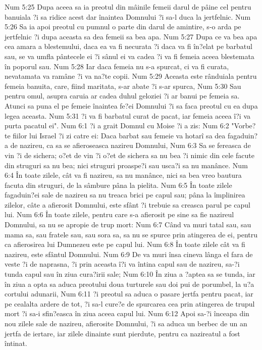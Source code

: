 Num 5:25  Dupa aceea sa ia preotul din mâinile femeii darul de pâine cel pentru banuiala ?i sa ridice acest dar înaintea Domnului ?i sa-l duca la jertfelnic.
Num 5:26  Sa ia apoi preotul cu pumnul o parte din darul de amintire, s-o arda pe jertfelnic ?i dupa aceasta sa dea femeii sa bea apa.
Num 5:27  Dupa ce va bea apa cea amara a blestemului, daca ea va fi necurata ?i daca va fi în?elat pe barbatul sau, se va umfla pântecele ei ?i sânul ei va cadea ?i va fi femeia aceea blestemata în poporul sau.
Num 5:28  Iar daca femeia nu s-a spurcat, ci va fi curata, nevatamata va ramâne ?i va na?te copii.
Num 5:29  Aceasta este rânduiala pentru femeia banuita, care, fiind maritata, s-ar abate ?i s-ar spurca,
Num 5:30  Sau pentru omul, asupra caruia ar cadea duhul geloziei ?i ar banui pe femeia sa. Atunci sa puna el pe femeie înaintea fe?ei Domnului ?i sa faca preotul cu ea dupa legea aceasta.
Num 5:31  ?i va fi barbatul curat de pacat, iar femeia aceea î?i va purta pacatul ei".
Num 6:1  ?i a grait Domnul cu Moise ?i a zis:
Num 6:2  "Vorbe?te fiilor lui Israel ?i zi catre ei: Daca barbat sau femeie va hotarî sa dea fagaduin?a de nazireu, ca sa se afieroseasca nazireu Domnului,
Num 6:3  Sa se fereasca de vin ?i de sichera; o?et de vin ?i o?et de sichera sa nu bea ?i nimic din cele facute din struguri sa nu bea; nici struguri proaspe?i sau usca?i sa nu manânce.
Num 6:4  În toate zilele, cât va fi nazireu, sa nu manânce, nici sa bea vreo bautura facuta din struguri, de la sâmbure pâna la pielita.
Num 6:5  În toate zilele fagaduin?ei sale de nazireu sa nu treaca brici pe capul sau; pâna la împlinirea zilelor, câte a afierosit Domnului, este sfânt ?i trebuie sa creasca parul pe capul lui.
Num 6:6  În toate zilele, pentru care s-a afierosit pe sine sa fie nazireul Domnului, sa nu se apropie de trup mort:
Num 6:7  Când va muri tatal sau, sau mama sa, sau fratele sau, sau sora sa, sa nu se spurce prin atingerea de ei, pentru ca afierosirea lui Dumnezeu este pe capul lui.
Num 6:8  În toate zilele cât va fi nazireu, este sfântul Domnului.
Num 6:9  De va muri însa cineva lânga el fara de veste ?i de naprasna, ?i prin aceasta î?i va întina capul sau de nazireu, sa-?i tunda capul sau în ziua cura?irii sale;
Num 6:10  În ziua a ?aptea sa se tunda, iar în ziua a opta sa aduca preotului doua turturele sau doi pui de porumbel, la u?a cortului adunarii,
Num 6:11  ?i preotul sa aduca o pasare jertfa pentru pacat, iar pe cealalta ardere de tot, ?i sa-l cure?e de spurcarea cea prin atingerea de trupul mort ?i sa-i sfin?easca în ziua aceea capul lui.
Num 6:12  Apoi sa-?i înceapa din nou zilele sale de nazireu, afierosite Domnului, ?i sa aduca un berbec de un an jertfa de iertare, iar zilele dinainte sunt pierdute, pentru ca nazireatul a fost întinat.
